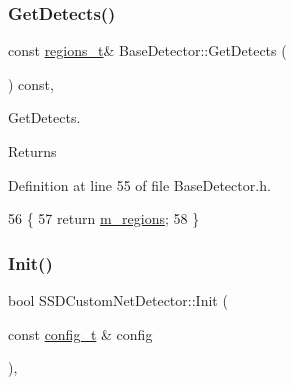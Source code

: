 \mbox{\label{class_base_detector_a52ac4b2feed15a47de84a69eb45c233f}} 
\subsubsection{\texorpdfstring{Get\+Detects()}{GetDetects()}}
{\footnotesize\ttfamily const \mbox{\hyperlink{defines_8h_a01db0de56a20f4342820a093c5154536}{regions\+\_\+t}}\& Base\+Detector\+::\+Get\+Detects (\begin{DoxyParamCaption}{ }\end{DoxyParamCaption}) const\hspace{0.3cm}{\ttfamily [inline]}, {\ttfamily [inherited]}}



Get\+Detects. 

\begin{DoxyReturn}{Returns}

\end{DoxyReturn}


Definition at line 55 of file Base\+Detector.\+h.


\begin{DoxyCode}
56     \{
57         \textcolor{keywordflow}{return} \mbox{\hyperlink{class_base_detector_a409c20093acba261db8354ca72058fce}{m\_regions}};
58     \}
\end{DoxyCode}
\mbox{\label{class_s_s_d_custom_net_detector_a2f228b0c7bbd679ff310158de119169b}} 
\subsubsection{\texorpdfstring{Init()}{Init()}}
{\footnotesize\ttfamily bool S\+S\+D\+Custom\+Net\+Detector\+::\+Init (\begin{DoxyParamCaption}\item[{const \mbox{\hyperlink{defines_8h_a81d657237a541d02f8eeefdd40191920}{config\+\_\+t}} \&}]{config }\end{DoxyParamCaption})\hspace{0.3cm}{\ttfamily [override]}, {\ttfamily [virtual]}}



